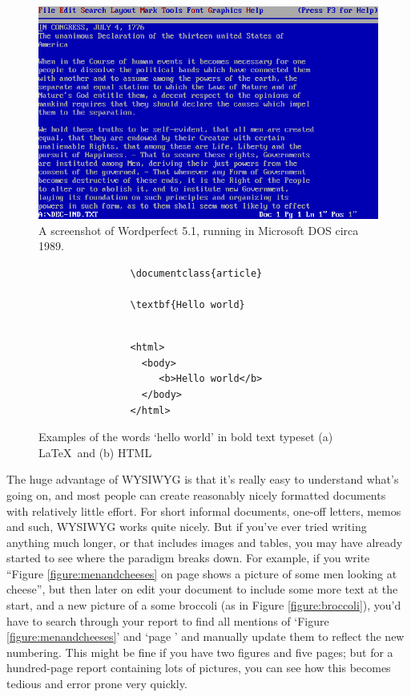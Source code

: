 \begin{refsection}
\begin{figure}
\centerline{\includegraphics[width=12cm]{images/wordperfect.png}}
\caption{A screenshot of Wordperfect 5.1, running in Microsoft DOS circa 1989.}\label{figure:wordperfect}
\end{figure}

\begin{figure}

\begin{verbatim}
                \documentclass{article}
                
                \textbf{Hello world}
                
\end{verbatim}
\begin{verbatim}
                <html>
                  <body>
                     <b>Hello world</b>
                  </body>
                </html>
\end{verbatim}

\caption{Examples of the words `hello world' in bold text typeset (a) \LaTeX\ and (b) HTML}\label{figure:helloworld}
\end{figure}


The huge advantage of WYSIWYG is that it's really easy to understand what's going on, and most people can create reasonably nicely formatted documents with relatively little effort. For short informal documents, one-off letters, memos and such, WYSIWYG works quite nicely. But if you've ever tried writing anything much longer, or that includes images and tables, you may have already started to see where the paradigm breaks down. For example, if you write ``Figure \ref{figure:menandcheeses} on page \pageref{figure:menandcheeses}  shows a picture of some men looking at cheese'', but then later on edit your document to include some more text at the start, and a new picture of a some broccoli (as in Figure \ref{figure:broccoli}), you'd have to search through your report to find all mentions of `Figure \ref{figure:menandcheeses}' and `page \pageref{figure:menandcheeses}' and manually update them to reflect the new numbering. This might be fine if you have two figures and five pages; but for a hundred-page report containing lots of pictures, you can see how this becomes tedious and error prone very quickly. 


\end{refsection}
